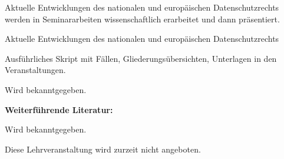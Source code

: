 \begin{course}
\begin{learningoutcomes}
Aktuelle Entwicklungen des nationalen und europäischen Datenschutzrechts werden in Seminararbeiten wissenschaftlich erarbeitet und dann präsentiert.


\end{learningoutcomes}

\begin{content}
Aktuelle Entwicklungen des nationalen und europäischen Datenschutzrechts


\end{content}

\begin{media}Ausführliches Skript mit Fällen, Gliederungsübersichten, Unterlagen in den Veranstaltungen.

\end{media}

\begin{literature}Wird bekanntgegeben.

 

\textbf{Weiterführende Literatur:}

 

Wird bekanntgegeben.

\end{literature}

\begin{remarks}Diese Lehrveranstaltung wird zurzeit nicht angeboten.

\end{remarks}

\end{course}